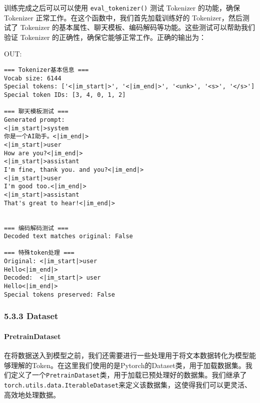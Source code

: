 \documentclass[
]{article}
\begin{document}
训练完成之后可以可以使用 \texttt{eval\_tokenizer()} 测试 Tokenizer
的功能，确保 Tokenizer 正常工作。在这个函数中，我们首先加载训练好的
Tokenizer，然后测试了 Tokenizer
的基本属性、聊天模板、编码解码等功能。这些测试可以帮助我们验证 Tokenizer
的正确性，确保它能够正常工作。正确的输出为：

OUT:

\begin{verbatim}
=== Tokenizer基本信息 ===
Vocab size: 6144
Special tokens: ['<|im_start|>', '<|im_end|>', '<unk>', '<s>', '</s>']
Special token IDs: [3, 4, 0, 1, 2]

=== 聊天模板测试 ===
Generated prompt:
<|im_start|>system
你是一个AI助手。<|im_end|>
<|im_start|>user
How are you?<|im_end|>
<|im_start|>assistant
I'm fine, thank you. and you?<|im_end|>
<|im_start|>user
I'm good too.<|im_end|>
<|im_start|>assistant
That's great to hear!<|im_end|>


=== 编码解码测试 ===
Decoded text matches original: False

=== 特殊token处理 ===
Original: <|im_start|>user
Hello<|im_end|>
Decoded:  <|im_start|> user
Hello<|im_end|>
Special tokens preserved: False
\end{verbatim}

\subsubsection{5.3.3 Dataset}\label{dataset}

\paragraph{PretrainDataset}\label{pretraindataset}

在将数据送入到模型之前，我们还需要进行一些处理用于将文本数据转化为模型能够理解的Token。在这里我们使用的是Pytorch的Dataset类，用于加载数据集。我们定义了一个\texttt{PretrainDataset}类，用于加载已预处理好的数据集。我们继承了\texttt{torch.utils.data.IterableDataset}来定义该数据集，这使得我们可以更灵活、高效地处理数据。
\end{document}
